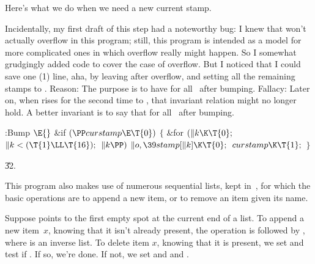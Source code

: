 Here's what we do when we need a new current stamp.

Incidentally, my first draft of this step had a noteworthy bug: I knew that
 won't actually overflow in this program; still, this program
is
intended as a model for more complicated ones in which overflow really
might happen. So I somewhat grudgingly added code to cover the case of
overflow. But I noticed that I could save one (1) line, aha, by
leaving  after overflow, and setting all the
remaining
stamps to . Reason: The purpose is to have  for
all~ after bumping. Fallacy: Later on, when  rises for
the second time to
, that invariant relation might no longer hold. A better
invariant
is to say that  for all~ after
bumping.

\Y\B\4:Bump \X${}\E{}$\6
\&{if} ${}(\PP\\{curstamp}\E\T{0}){}$\5
${}\{{}$\1\6
\&{for} ${}(\|k\K\T{0};{}$ ${}\|k<(\T{1}\LL\T{16});{}$ ${}\|k\PP){}$\1\5
${}\|o,\39\\{stamp}[\|k]\K\T{0};{}$\2\6
${}\\{curstamp}\K\T{1};{}$\6
\4${}\}{}$\2\par
\U32.\fi

This program also makes use of numerous sequential lists, kept in~,
for which the basic operations are to append a new item, or to remove
an item given its name.

Suppose  points to the first empty spot at the current end of a list.
To append a new item~$x$, knowing that it isn't already present,
the operation is  followed by , where %
 is an
inverse list. To delete item $x$, knowing that it is present,
we set  and test if . If so, we're done.
If not,
we set  and  and .

